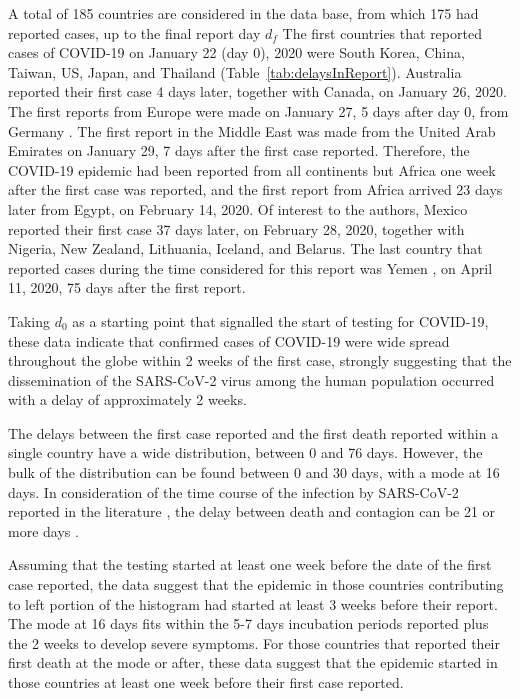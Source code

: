 \documentclass[8pt]{article}
\begin{document}
A total of 185 countries are considered in the data base, from which 175 had reported cases, up to the final report day $d_f$ 
The first countries that reported cases of COVID-19 on January 22 (day 0), 2020 were South Korea, China, Taiwan, US, Japan, and Thailand (Table~\ref{tab:delaysInReport}). Australia reported their first case 4 days later, together with Canada, on January 26, 2020. The first reports from Europe were made  on January 27, 5 days after day 0, from Germany \citep{rothe2020transmission}. The first report in the Middle East was made from the United Arab Emirates on January 29, 7 days after the first case reported.  Therefore, the COVID-19 epidemic had been reported from all continents but Africa one week after the first case was reported, and the first report from Africa arrived 23 days later from Egypt, on February 14, 2020. Of interest to the authors, Mexico reported their first case 37 days later, on February 28, 2020, together with Nigeria, New Zealand, Lithuania, Iceland, and Belarus. The last country that reported cases during the time considered for this report was Yemen , on April 11, 2020, 75 days after the first report.

Taking $d_0$ as a starting point that signalled the start of testing for COVID-19, these data indicate that confirmed  cases of COVID-19 were wide spread throughout the globe within 2 weeks of the first case, strongly suggesting that the dissemination of the SARS-CoV-2 virus among the human population occurred with a delay of approximately 2 weeks. 


The delays between the first case reported and the first death reported within a single country have a wide distribution, between 0 and 76 days. 
However, the bulk of the distribution can be found between 0 and 30 days, with a mode at 16 days. In consideration of the time course of the infection by SARS-CoV-2 reported in the literature \citep{}, the delay between death and contagion can be 21 or more days \citep{}. 

Assuming that the testing started at least one week before the date of the first case reported, the data suggest that the epidemic in those countries contributing to left portion of the histogram had started at least 3 weeks before their report. The mode at 16 days fits within the 5-7 days incubation periods reported plus the 2 weeks to develop severe symptoms. For those countries that reported their first death at the mode or after, these data suggest that the epidemic started in those countries at least one week before their first case reported.
\end{document}
